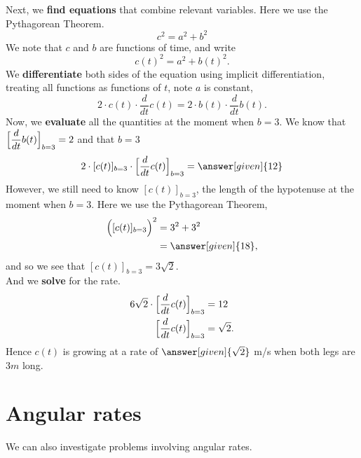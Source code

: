 \documentclass{ximera}
\begin{document}
\begin{example}
\begin{explanation}
    Next, we  \textbf{find equations} that combine relevant
    variables. Here we use the Pythagorean Theorem.
    \[
    c^2 = a^2 + b^2
    \]
   We note that $c$ and $b$ are functions of time, and write
    \[
    c(t)^2 = a^2 + b(t)^2.
    \]
    We \textbf{differentiate} both sides of the equation using
    implicit differentiation, treating all functions as functions of
    $t$, note $a$ is constant,
    \[
    2\cdot c(t)\cdot \dfrac{d}{dt}c(t) = 2\cdot b(t)\cdot \dfrac{d}{dt}b(t).
    \]
    Now, we \textbf{evaluate} all the quantities at the moment when $b=3$. We
    know that $\Bigl[\dfrac{d}{dt}b(t)\Bigr]_{b=3} = 2$ and that $b = 3$
    \[
    2\cdot [c(t)]_{b=3}\cdot \Bigl[\dfrac{d}{dt}c(t)\Bigr]_{b=3} = \answer[given]{12}
    \]
    However, we still need to know $[c(t)]_{b=3}$, the length of the hypotenuse at the moment when $b=3$. Here we use
    the Pythagorean Theorem,
    \begin{align*}
    \Bigl([c(t)]_{b=3}\Bigr)^2 &= 3^2 + 3^2\\
    &=\answer[given]{18},
    \end{align*}
    and so we see that $[c(t)]_{b=3} = 3\sqrt{2}$. \\
    And we \textbf{solve} for the rate.\\
    \begin{align*}
      6\sqrt{2}\cdot \Bigl[\dfrac{d}{dt}c(t)\Bigr]_{b=3} &= 12 \\     
      \Bigl[\dfrac{d}{dt}c(t)\Bigr]_{b=3} &= \sqrt{2}.
    \end{align*}
    Hence $c(t)$ is growing at a rate of $\answer[given]{\sqrt{2}}$ m/s when both legs are $3m$ long.
  \end{explanation}
\end{example}


\section{Angular rates}


We can also investigate problems involving angular rates.
\end{document}
